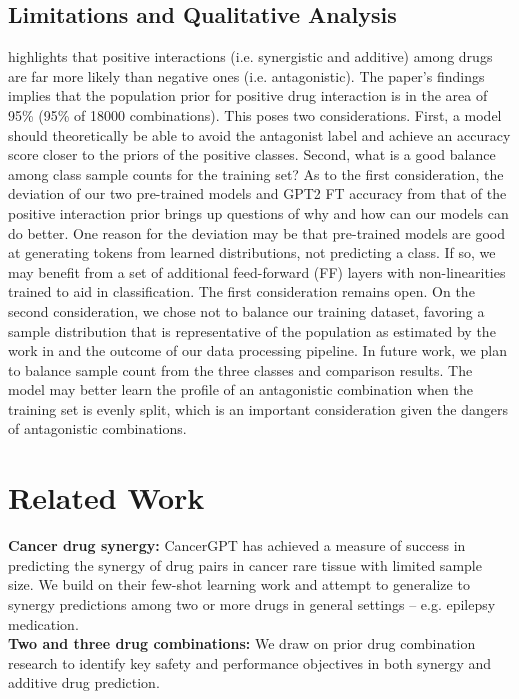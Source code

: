 \documentclass[11pt]{article}
\begin{document}
\subsection{Limitations and Qualitative Analysis}
\cite{Yin2014-ix} highlights that positive interactions (i.e. synergistic and additive) among drugs are far more likely than negative ones (i.e. antagonistic). The paper's findings implies that the population prior for positive drug interaction is in the area of 95\% (95\% of 18000 combinations). This poses two considerations. First, a model should theoretically be able to avoid the antagonist label and achieve an accuracy score closer to the priors of the positive classes. Second, what is a good balance among class sample counts for the training set? As to the first consideration, the deviation of our two pre-trained models and GPT2 FT accuracy from that of the positive interaction prior brings up questions of why and how can our models can do better. One reason for the deviation may be that pre-trained models are good at generating tokens from learned distributions, not predicting a class. If so, we may benefit from a set of additional feed-forward (FF) layers with non-linearities trained to aid in classification. The first consideration remains open. On the second consideration, we chose not to balance our training dataset, favoring a sample distribution that is representative of the population as estimated by the work in \cite{Yin2014-ix} and the outcome of our data processing pipeline. In future work, we plan to balance sample count from the three classes and comparison results. The model may better learn the profile of an antagonistic combination when the training set is evenly split, which is an important consideration given the dangers of antagonistic combinations.

\section{Related Work}

\textbf{Cancer drug synergy:} CancerGPT \cite{Li2023-lq} has achieved a measure of success in predicting the synergy of drug pairs in cancer rare tissue with limited sample size. We build on their few-shot learning work and attempt to generalize to synergy predictions among two or more drugs in general settings -- e.g. epilepsy medication.\\
\noindent\textbf{Two and three drug combinations:} We draw on prior drug combination research \cite{Luszczki2021-nf, Luszczki2020-bq} to identify key safety and performance objectives in both synergy and additive drug prediction.


\end{document}
